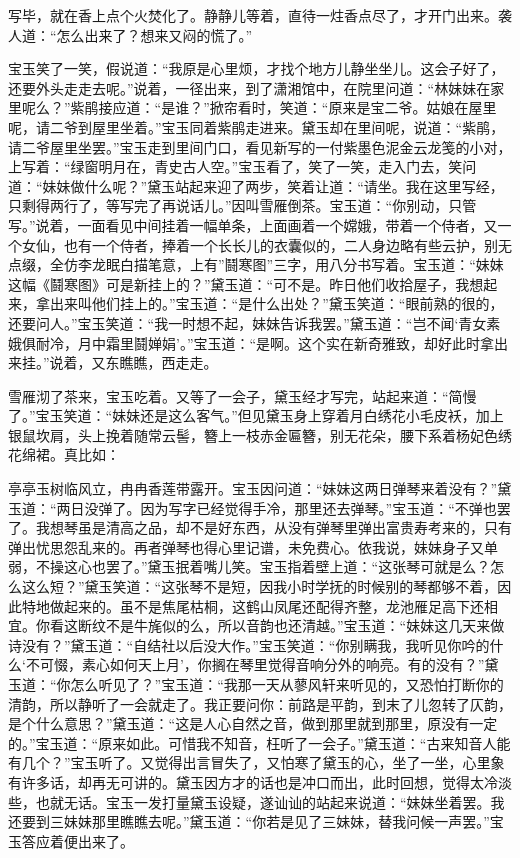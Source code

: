 \begin{parag}
    写毕，就在香上点个火焚化了。静静儿等着，直待一炷香点尽了，才开门出来。袭人道：“怎么出来了？想来又闷的慌了。”
\end{parag}

\begin{parag}
    宝玉笑了一笑，假说道：“我原是心里烦，才找个地方儿静坐坐儿。这会子好了，还要外头走走去呢。”说着，一径出来，到了潇湘馆中，在院里问道：“林妹妹在家里呢么？”紫鹃接应道：“是谁？”掀帘看时，笑道：“原来是宝二爷。姑娘在屋里呢，请二爷到屋里坐着。”宝玉同着紫鹃走进来。黛玉却在里间呢，说道：“紫鹃，请二爷屋里坐罢。”宝玉走到里间门口，看见新写的一付紫墨色泥金云龙笺的小对，上写着：“绿窗明月在，青史古人空。”宝玉看了，笑了一笑，走入门去，笑问道：“妹妹做什么呢？”黛玉站起来迎了两步，笑着让道：“请坐。我在这里写经，只剩得两行了，等写完了再说话儿。”因叫雪雁倒茶。宝玉道：“你别动，只管写。”说着，一面看见中间挂着一幅单条，上面画着一个嫦娥，带着一个侍者，又一个女仙，也有一个侍者，捧着一个长长儿的衣囊似的，二人身边略有些云护，别无点缀，全仿李龙眠白描笔意，上有”鬪寒图”三字，用八分书写着。宝玉道：“妹妹这幅《鬪寒图》可是新挂上的？”黛玉道：“可不是。昨日他们收拾屋子，我想起来，拿出来叫他们挂上的。”宝玉道：“是什么出处？”黛玉笑道：“眼前熟的很的，还要问人。”宝玉笑道：“我一时想不起，妹妹告诉我罢。”黛玉道：“岂不闻‘青女素娥俱耐冷，月中霜里鬪婵娟’。”宝玉道：“是啊。这个实在新奇雅致，却好此时拿出来挂。”说着，又东瞧瞧，西走走。
\end{parag}


\begin{parag}
    雪雁沏了茶来，宝玉吃着。又等了一会子，黛玉经才写完，站起来道：“简慢了。”宝玉笑道：“妹妹还是这么客气。”但见黛玉身上穿着月白绣花小毛皮袄，加上银鼠坎肩，头上挽着随常云髻，簪上一枝赤金匾簪，别无花朵，腰下系着杨妃色绣花绵裙。真比如：
\end{parag}


\begin{qute2sp}
    亭亭玉树临风立，冉冉香莲带露开。宝玉因问道：“妹妹这两日弹琴来着没有？”黛玉道：“两日没弹了。因为写字已经觉得手冷，那里还去弹琴。”宝玉道：“不弹也罢了。我想琴虽是清高之品，却不是好东西，从没有弹琴里弹出富贵寿考来的，只有弹出忧思怨乱来的。再者弹琴也得心里记谱，未免费心。依我说，妹妹身子又单弱，不操这心也罢了。”黛玉抿着嘴儿笑。宝玉指着壁上道：“这张琴可就是么？怎么这么短？”黛玉笑道：“这张琴不是短，因我小时学抚的时候别的琴都够不着，因此特地做起来的。虽不是焦尾枯桐，这鹤山凤尾还配得齐整，龙池雁足高下还相宜。你看这断纹不是牛旄似的么，所以音韵也还清越。”宝玉道：“妹妹这几天来做诗没有？”黛玉道：“自结社以后没大作。”宝玉笑道：“你别瞒我，我听见你吟的什么‘不可惙，素心如何天上月’，你搁在琴里觉得音响分外的响亮。有的没有？”黛玉道：“你怎么听见了？”宝玉道：“我那一天从蓼风轩来听见的，又恐怕打断你的清韵，所以静听了一会就走了。我正要问你：前路是平韵，到末了儿忽转了仄韵，是个什么意思？”黛玉道：“这是人心自然之音，做到那里就到那里，原没有一定的。”宝玉道：“原来如此。可惜我不知音，枉听了一会子。”黛玉道：“古来知音人能有几个？”宝玉听了。又觉得出言冒失了，又怕寒了黛玉的心，坐了一坐，心里象有许多话，却再无可讲的。黛玉因方才的话也是冲口而出，此时回想，觉得太冷淡些，也就无话。宝玉一发打量黛玉设疑，遂讪讪的站起来说道：“妹妹坐着罢。我还要到三妹妹那里瞧瞧去呢。”黛玉道：“你若是见了三妹妹，替我问候一声罢。”宝玉答应着便出来了。
\end{qute2sp}


